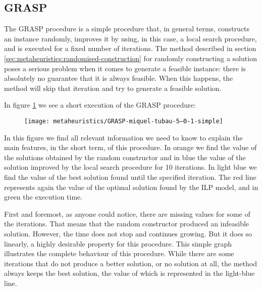 \subsection{GRASP}
\label{sec:comparative-results:grasp}

The GRASP procedure is a simple procedure that, in general terms, constructs an instance
randomly, improves it by using, in this case, a local search procedure, and is executed for a
fixed number of iterations. The method described in section
\ref{sec:metaheuristics:randomised-construction} for randomly constructing a solution poses a
serious problem when it comes to generate a feasible instance: there is absolutely no guarantee
that it is always feasible. When this happens, the method will skip that iteration and try to
generate a feasible solution.

\hfill

In figure \ref{fig:trace:grasp:t-5-simple} we see a short execution of the GRASP procedure:

\begin{figure}[H]
    \centering
    \texttt{[image: metaheuristics/GRASP-miquel-tubau-5--0-1-simple]}
    \label{fig:trace:grasp:t-5-simple}
\end{figure}

In this figure we find all relevant information we need to know to explain the main
features, in the short term, of this procedure. In orange we find the value of the solutions
obtained by the random constructor and in blue the value of the solution improved by the local
search procedure for 10 iterations. In light blue we find the value of the best solution found
until the specified iteration. The red line represents again the value of the optimal solution
found by the ILP model, and in green the execution time.

\hfill

First and foremost, as anyone could notice, there are missing values for some of the
iterations. That means that the random constructor produced an infeasible solution. However,
the time does not stop and continues growing. But it does so linearly, a highly desirable
property for this procedure. This simple graph illustrates the complete behaviour of this
procedure. While there are some iterations that do not produce a better solution, or no
solution at all, the method always keeps the best solution, the value of which is represented
in the light-blue line.

